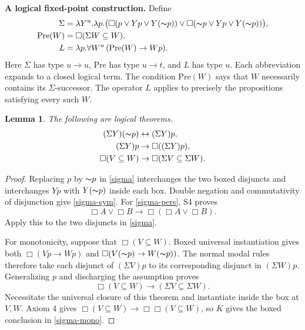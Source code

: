 \documentclass[12pt,leqno]{article}
\newcommand{\OR}{\ensuremath{\vee}}
\newcommand{\IFF}{\ensuremath{\leftrightarrow}}
\newcommand{\IC}{\ensuremath{\rightarrow}}
\newcommand{\NOT}{\ensuremath{\text{$\thicksim$}}}
\newcommand{\Pre}{\mathrm{Pre}}
\newtheorem{lemma}{Lemma}
\begin{document}
\medskip
\noindent\textbf{A logical fixed-point construction.}
Define
\begin{align}
 \Sigma&=\lambda Y^u.\lambda p.
  \bigl(\Box(p\OR Yp\OR Y(\NOT p))
       \OR\Box(\NOT p\OR Yp\OR Y(\NOT p))\bigr),\label{sigma}\\
 \Pre(W)&=\Box(\Sigma W\subseteq W),\label{pre}\\
 L&=\lambda p.\forall W^u\,(\Pre(W)\IC Wp).\label{L}
\end{align}
Here $\Sigma$ has type $u\to u$, $\Pre$ has type $u\to t$, and
$L$ has type $u$. Each abbreviation expands to a closed logical term.
The condition $\Pre(W)$ says that $W$ necessarily contains its
$\Sigma$-successor. The operator $L$ applies to precisely the
propositions satisfying every such $W$.

\begin{lemma}\label{sigma-properties}
The following are logical theorems.
\begin{align}
 (\Sigma Y)(\NOT p)&\IFF(\Sigma Y)p,\label{sigma-sym}\\
 (\Sigma Y)p&\IC\Box((\Sigma Y)p),\label{sigma-pers}\\
 \Box(V\subseteq W)&\IC\Box(\Sigma V\subseteq\Sigma W).
 \label{sigma-mono}
\end{align}
\end{lemma}
\begin{proof}
Replacing $p$ by $\NOT p$ in \eqref{sigma} interchanges the two boxed
disjuncts and interchanges $Yp$ with $Y(\NOT p)$ inside each box.
Double negation and commutativity of disjunction give
\eqref{sigma-sym}. For \eqref{sigma-pers}, S4 proves
\[
 \Box A\OR\Box B\IC\Box(\Box A\OR\Box B).
\]
Apply this to the two disjuncts in \eqref{sigma}.

For monotonicity, suppose that $\Box(V\subseteq W)$. Boxed universal
instantiation gives both $\Box(Vp\IC Wp)$ and
$\Box(V(\NOT p)\IC W(\NOT p))$. The normal modal rules therefore
take each disjunct of $(\Sigma V)p$ to its corresponding disjunct in
$(\Sigma W)p$. Generalizing $p$ and discharging the assumption proves
\begin{equation}
 \Box(V\subseteq W)\IC(\Sigma V\subseteq\Sigma W).
 \label{mono-local}
\end{equation}
Necessitate the universal closure of this theorem and instantiate inside
the box at $V,W$. Axiom $4$ gives
$\Box(V\subseteq W)\IC\Box\Box(V\subseteq W)$, so $K$ gives
the boxed conclusion in \eqref{sigma-mono}.
\end{proof}
\end{document}
